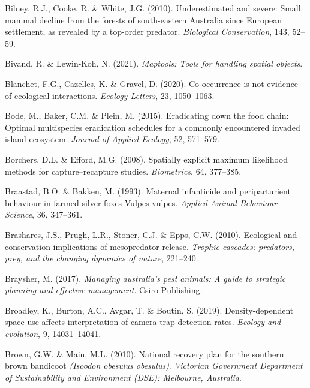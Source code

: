 \documentclass[11pt,a4paper,titlepage,twoside,openright]{style/unimelbthesis}
\begin{document}
\begin{mainmatter}
\leavevmode\hypertarget{ref-bilney2010underestimated}{}%
Bilney, R.J., Cooke, R. \& White, J.G. (2010). Underestimated and severe: Small mammal decline from the forests of south-eastern Australia since European settlement, as revealed by a top-order predator. \emph{Biological Conservation}, 143, 52--59.

\leavevmode\hypertarget{ref-maptools}{}%
Bivand, R. \& Lewin-Koh, N. (2021). \emph{Maptools: Tools for handling spatial objects}.

\leavevmode\hypertarget{ref-guillaume2020co}{}%
Blanchet, F.G., Cazelles, K. \& Gravel, D. (2020). Co-occurrence is not evidence of ecological interactions. \emph{Ecology Letters}, 23, 1050--1063.

\leavevmode\hypertarget{ref-bode2015eradicating}{}%
Bode, M., Baker, C.M. \& Plein, M. (2015). Eradicating down the food chain: Optimal multispecies eradication schedules for a commonly encountered invaded island ecosystem. \emph{Journal of Applied Ecology}, 52, 571--579.

\leavevmode\hypertarget{ref-borchers2008spatially}{}%
Borchers, D.L. \& Efford, M.G. (2008). Spatially explicit maximum likelihood methods for capture--recapture studies. \emph{Biometrics}, 64, 377--385.

\leavevmode\hypertarget{ref-braastad1993maternal}{}%
Braastad, B.O. \& Bakken, M. (1993). Maternal infanticide and periparturient behaviour in farmed silver foxes Vulpes vulpes. \emph{Applied Animal Behaviour Science}, 36, 347--361.

\leavevmode\hypertarget{ref-brashares2010ecological}{}%
Brashares, J.S., Prugh, L.R., Stoner, C.J. \& Epps, C.W. (2010). Ecological and conservation implications of mesopredator release. \emph{Trophic cascades: predators, prey, and the changing dynamics of nature}, 221--240.

\leavevmode\hypertarget{ref-braysher2017managing}{}%
Braysher, M. (2017). \emph{Managing australia's pest animals: A guide to strategic planning and effective management}. Csiro Publishing.

\leavevmode\hypertarget{ref-broadley2019density}{}%
Broadley, K., Burton, A.C., Avgar, T. \& Boutin, S. (2019). Density-dependent space use affects interpretation of camera trap detection rates. \emph{Ecology and evolution}, 9, 14031--14041.

\leavevmode\hypertarget{ref-brown2010national}{}%
Brown, G.W. \& Main, M.L. (2010). National recovery plan for the southern brown bandicoot \emph{(Isoodon obesulus obesulus)}. \emph{Victorian Government Department of Sustainability and Environment (DSE): Melbourne, Australia}.


\end{mainmatter}
\end{document}
